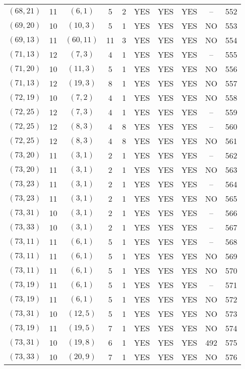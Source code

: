 \begin{longtable}{|c|c|c|c|c|c|c|c|c|c|}
$(68, 21)$ & 11 & $(6, 1)$ & 5 & 2 & YES & YES & YES & -- & 552\\
$(69, 20)$ & 10 & $(10, 3)$ & 5 & 1 & YES & YES & YES & NO & 553\\
$(69, 13)$ & 11 & $(60, 11)$ & 11 & 3 & YES & YES & YES & NO & 554\\
$(71, 13)$ & 12 & $(7, 3)$ & 4 & 1 & YES & YES & YES & -- & 555\\
$(71, 20)$ & 10 & $(11, 3)$ & 5 & 1 & YES & YES & YES & NO & 556\\
$(71, 13)$ & 12 & $(19, 3)$ & 8 & 1 & YES & YES & YES & NO & 557\\
$(72, 19)$ & 10 & $(7, 2)$ & 4 & 1 & YES & YES & YES & NO & 558\\
$(72, 25)$ & 12 & $(7, 3)$ & 4 & 1 & YES & YES & YES & -- & 559\\
$(72, 25)$ & 12 & $(8, 3)$ & 4 & 8 & YES & YES & YES & -- & 560\\
$(72, 25)$ & 12 & $(8, 3)$ & 4 & 8 & YES & YES & YES & NO & 561\\
$(73, 20)$ & 11 & $(3, 1)$ & 2 & 1 & YES & YES & YES & -- & 562\\
$(73, 20)$ & 11 & $(3, 1)$ & 2 & 1 & YES & YES & YES & NO & 563\\
$(73, 23)$ & 11 & $(3, 1)$ & 2 & 1 & YES & YES & YES & -- & 564\\
$(73, 23)$ & 11 & $(3, 1)$ & 2 & 1 & YES & YES & YES & NO & 565\\
$(73, 31)$ & 10 & $(3, 1)$ & 2 & 1 & YES & YES & YES & -- & 566\\
$(73, 33)$ & 10 & $(3, 1)$ & 2 & 1 & YES & YES & YES & -- & 567\\
$(73, 11)$ & 11 & $(6, 1)$ & 5 & 1 & YES & YES & YES & -- & 568\\
$(73, 11)$ & 11 & $(6, 1)$ & 5 & 1 & YES & YES & YES & NO & 569\\
$(73, 11)$ & 11 & $(6, 1)$ & 5 & 1 & YES & YES & YES & NO & 570\\
$(73, 19)$ & 11 & $(6, 1)$ & 5 & 1 & YES & YES & YES & -- & 571\\
$(73, 19)$ & 11 & $(6, 1)$ & 5 & 1 & YES & YES & YES & NO & 572\\
$(73, 31)$ & 10 & $(12, 5)$ & 5 & 1 & YES & YES & YES & NO & 573\\
$(73, 19)$ & 11 & $(19, 5)$ & 7 & 1 & YES & YES & YES & NO & 574\\
$(73, 31)$ & 10 & $(19, 8)$ & 6 & 1 & YES & YES & YES & 492 & 575\\
$(73, 33)$ & 10 & $(20, 9)$ & 7 & 1 & YES & YES & YES & NO & 576\\

\end{longtable}
